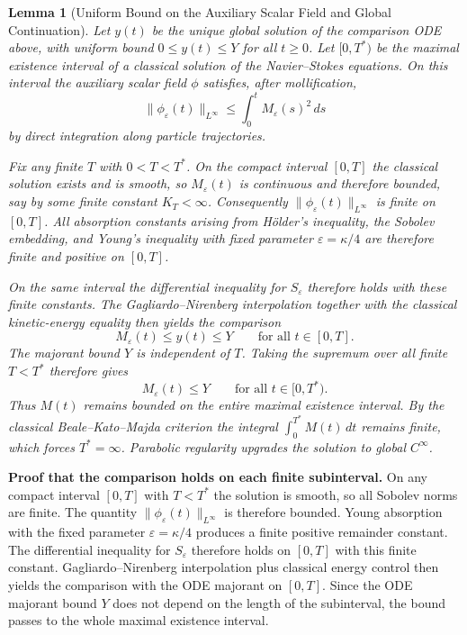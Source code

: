\documentclass[11pt,a4paper]{article}
\newtheorem{lemma}{Lemma}
\begin{document}
\begin{lemma}[Uniform Bound on the Auxiliary Scalar Field and Global Continuation]
Let \(y(t)\) be the unique global solution of the comparison ODE above, with uniform bound \(0 \le y(t) \le Y\) for all \(t \ge 0\). Let \([0, T^*)\) be the maximal existence interval of a classical solution of the Navier--Stokes equations. On this interval the auxiliary scalar field \(\phi\) satisfies, after mollification,
\[
\|\phi_\varepsilon(t)\|_{L^\infty} \le \int_0^t M_\varepsilon(s)^2 \, ds
\]
by direct integration along particle trajectories.

Fix any finite \(T\) with \(0 < T < T^*\). On the compact interval \([0, T]\) the classical solution exists and is smooth, so \(M_\varepsilon(t)\) is continuous and therefore bounded, say by some finite constant \(K_T < \infty\). Consequently \(\|\phi_\varepsilon(t)\|_{L^\infty}\) is finite on \([0, T]\). All absorption constants arising from Hölder's inequality, the Sobolev embedding, and Young's inequality with fixed parameter \(\varepsilon = \kappa/4\) are therefore finite and positive on \([0, T]\).

On the same interval the differential inequality for \(S_\varepsilon\) therefore holds with these finite constants. The Gagliardo--Nirenberg interpolation together with the classical kinetic-energy equality then yields the comparison
\[
M_\varepsilon(t) \le y(t) \le Y \qquad \text{for all } t \in [0, T].
\]
The majorant bound \(Y\) is independent of \(T\). Taking the supremum over all finite \(T < T^*\) therefore gives
\[
M_\varepsilon(t) \le Y \qquad \text{for all } t \in [0, T^*).
\]
Thus \(M(t)\) remains bounded on the entire maximal existence interval. By the classical Beale--Kato--Majda criterion the integral \(\int_0^{T^*} M(t) \, dt\) remains finite, which forces \(T^* = \infty\). Parabolic regularity upgrades the solution to global \(C^\infty\).

\end{lemma}

\textbf{Proof that the comparison holds on each finite subinterval.} On any compact interval \([0, T]\) with \(T < T^*\) the solution is smooth, so all Sobolev norms are finite. The quantity \(\|\phi_\varepsilon(t)\|_{L^\infty}\) is therefore bounded. Young absorption with the fixed parameter \(\varepsilon = \kappa/4\) produces a finite positive remainder constant. The differential inequality for \(S_\varepsilon\) therefore holds on \([0, T]\) with this finite constant. Gagliardo--Nirenberg interpolation plus classical energy control then yields the comparison with the ODE majorant on \([0, T]\). Since the ODE majorant bound \(Y\) does not depend on the length of the subinterval, the bound passes to the whole maximal existence interval.
\end{document}
